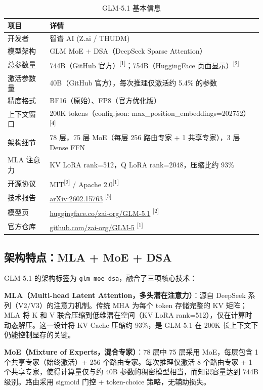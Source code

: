 \documentclass[UTF8,a4paper,10pt,oneside]{ctexart}
\begin{document}
\begin{table}[htbp]
\centering
\caption{GLM-5.1 基本信息}
\begin{tabular}{p{3cm}p{9cm}}
\hline
\textbf{项目} & \textbf{详情} \\
\hline
开发者 & 智谱 AI (Z.ai / THUDM) \\
模型架构 & GLM MoE + DSA（DeepSeek Sparse Attention） \\
总参数量 & 744B（GitHub 官方）\textsuperscript{[1]}；754B（HuggingFace 页面显示）\textsuperscript{[2]} \\
激活参数量 & 40B（GitHub 官方），每次推理仅激活约 5.4\% 的参数 \\
精度格式 & BF16（原始）、FP8（官方优化版） \\
上下文窗口 & 200K tokens（config.json: max\_position\_embeddings=202752）\textsuperscript{[4]} \\
架构细节 & 78 层，75 层 MoE（每层 256 路由专家 + 1 共享专家），3 层 Dense FFN \\
MLA 注意力 & KV LoRA rank=512，Q LoRA rank=2048，压缩比约 93\% \\
开源协议 & MIT\textsuperscript{[2]} / Apache 2.0\textsuperscript{[1]} \\
技术报告 & \href{https://arxiv.org/abs/2602.15763}{arXiv:2602.15763} \textsuperscript{[5]} \\
模型页 & \href{https://huggingface.co/zai-org/GLM-5.1}{huggingface.co/zai-org/GLM-5.1} \textsuperscript{[2]} \\
官方仓库 & \href{https://github.com/zai-org/GLM-5}{github.com/zai-org/GLM-5} \textsuperscript{[1]} \\
\hline
\end{tabular}
\end{table}

\subsection{架构特点：MLA + MoE + DSA}

GLM-5.1 的架构标签为 \texttt{glm\_moe\_dsa}，融合了三项核心技术：

\textbf{MLA（Multi-head Latent Attention，多头潜在注意力）}：源自 DeepSeek 系列（V2/V3）的注意力机制。传统 MHA 为每个 token 存储完整的 KV 矩阵；MLA 将 K 和 V 联合压缩到低维潜在空间（KV LoRA rank=512），仅在计算时动态解压。这一设计将 KV Cache 压缩约 93\%，是 GLM-5.1 在 200K 长上下文下仍能控制显存的关键。

\textbf{MoE（Mixture of Experts，混合专家）}：78 层中 75 层采用 MoE，每层包含 1 个共享专家（始终激活）+ 256 个路由专家。每次推理仅激活 8 个路由专家 + 1 个共享专家，使得计算量仅与约 40B 参数的稠密模型相当，而知识容量达到 744B 级别。路由采用 sigmoid 门控 + token-choice 策略，无辅助损失。
\end{document}
